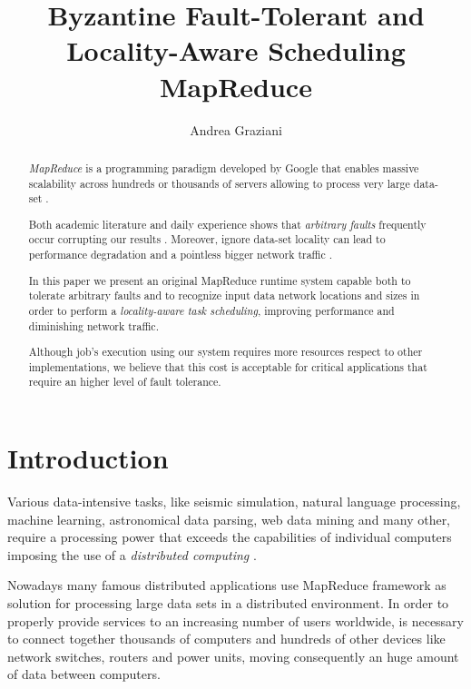 \documentclass[sigchi]{acmart}
\begin{document}
\title{Byzantine Fault-Tolerant and Locality-Aware Scheduling MapReduce}

\author{Andrea Graziani}

\renewcommand{\shortauthors}{Andrea Graziani (0273395)}

\begin{abstract}
\textit{MapReduce} is a programming paradigm developed by Google that enables massive scalability across hundreds or thousands of servers allowing to process very large data-set \cite{IBMWhatIsMapReduce}.

Both academic literature and daily experience shows that \textit{arbitrary faults} frequently occur corrupting our results \cite{BFLMapReduce}. Moreover, ignore data-set locality can lead to performance degradation and a pointless bigger network traffic \cite{LARTS}.

In this paper we present an original MapReduce runtime system capable both to tolerate arbitrary faults and to recognize input data network locations and sizes in order to perform a \textit{locality-aware task scheduling}, improving performance and diminishing network traffic.

Although job's execution using our system requires more resources respect to other implementations, we believe that this cost is acceptable for critical applications that require an higher level of fault tolerance.
\end{abstract}

\maketitle

\section{Introduction}

Various data-intensive tasks, like seismic simulation, natural language processing, machine learning, astronomical data parsing, web data mining and many other, require a processing power that exceeds the capabilities of individual computers imposing the use of a \textit{distributed computing} \cite{LARTS}.

Nowadays many famous distributed applications use MapReduce framework as solution for processing large data sets in a distributed environment. In order to properly provide services to an increasing number of users worldwide, is necessary to connect together thousands of computers and hundreds of other devices like network switches, routers and power units, moving consequently an huge amount of data between computers. 
\end{document}
